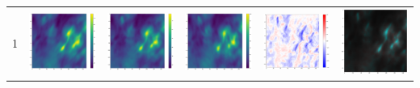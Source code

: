 \documentclass[landscape,paperwidth=46truein,paperheight=41truein,fontscale=0.3]{baposter}
\begin{document}
\begin{poster}
{\begin{center}
\begin{minipage}{0.97 \columnwidth}
\begin{multicols}{2}
{\begin{tabular}{c c c c c c }
					1 &
					\includegraphics[width=0.185\linewidth]{../../../../src/python/minnd/movies/ar1/intensity/minus/fig_00} &
					\includegraphics[width=0.185\linewidth]{../../../../src/python/minnd/movies/ar1/intensity/zero/fig_00} &
					\includegraphics[width=0.185\linewidth]{../../../../src/python/minnd/movies/ar1/intensity/plus/fig_00} &
					\includegraphics[width=0.185\linewidth]{../../../../src/python/minnd/movies/ar1/velocity/zero-ave/fig_00} &
					\includegraphics[width=0.185\linewidth]{../../../../src/python/minnd/movies/ar1/intensity-velocity/zero-ave/fig_00} \\
					

\end{tabular}}
\end{multicols}
\end{minipage}
\end{center}}
\end{poster}
\end{document}
